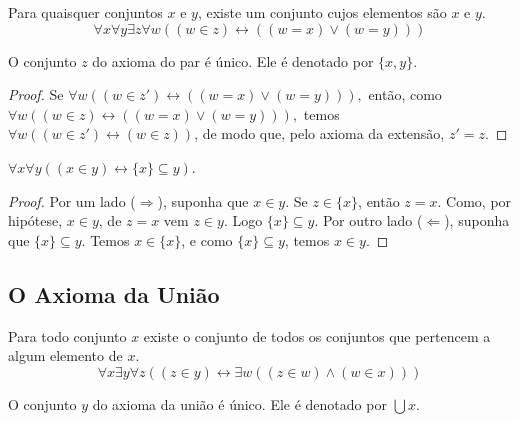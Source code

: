 \begin{axiom}[do Par] \label{ax:3}
    Para quaisquer conjuntos $x$ e $y$, existe um conjunto cujos elementos são $x$ e $y$.
        \[
            \boxed{
                \forall x \forall y \exists z \forall w ((w \in z) \leftrightarrow ((w = x) \lor (w = y)))
            }
        \]
\end{axiom}

\begin{proposition} \label{prop.set:extensaounico2}
    O conjunto $z$ do axioma do par é único. Ele é denotado por $\{x,y\}$.
\end{proposition}

\begin{proof}
    Se
        $
            \forall w ( (w \in z') \leftrightarrow ((w=x) \lor (w=y)) ),
        $
    então, como
        $
            \forall w ((w \in z) \leftrightarrow ((w = x) \lor (w = y))),
        $
    temos $\forall w ((w \in z') \leftrightarrow (w \in z) )$, de modo que, pelo axioma da extensão, $z' = z$. \blackproof
\end{proof}

\begin{proposition}
    $\forall x \forall y((x \in y) \leftrightarrow \{x\} \subseteq y)$.
\end{proposition}

\begin{proof}
    Por um lado ($\Rightarrow$), suponha que $x \in y$. Se $z \in \{x\}$, então $z = x$. Como, por hipótese, $x \in y$, de $z=x$ vem $z \in y$. Logo $\{x\} \subseteq y$. Por outro lado ($\Leftarrow$), suponha que $\{x\} \subseteq y$. Temos $x \in \{x\}$, e como $\{x\} \subseteq y$, temos $x \in y$. \blackproof
\end{proof}

\subsection{O Axioma da União}

\begin{axiom}[da União] \label{ax:4}
    Para todo conjunto $x$ existe o conjunto de todos os conjuntos que pertencem a algum elemento de $x$.
        \[
            \boxed{
                \forall x \exists y \forall z ((z \in y) \leftrightarrow \exists w ( (z \in w) \land (w \in x)))
            }
        \]
\end{axiom}

\begin{proposition} \label{prop.set:extensaounico3}
    O conjunto $y$ do axioma da união é único. Ele é denotado por $\bigcup x $.
\end{proposition}

